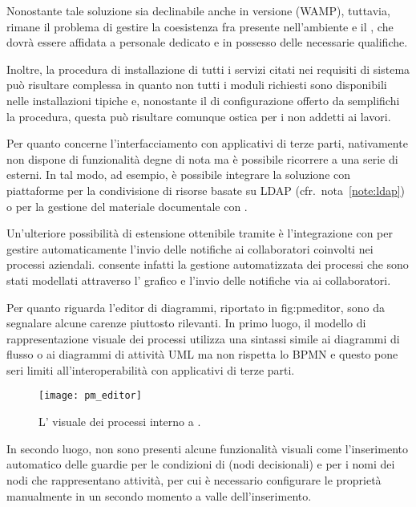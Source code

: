 Nonostante tale soluzione sia declinabile anche in versione  (WAMP), tuttavia, rimane il problema di gestire la coesistenza fra  presente nell'ambiente  e il  , che dovrà essere affidata a personale dedicato e in possesso delle necessarie qualifiche.

Inoltre, la procedura di installazione di tutti i servizi citati nei requisiti di sistema può risultare complessa in quanto non tutti i moduli richiesti sono disponibili nelle installazioni tipiche e, nonostante il  di configurazione offerto da \progname semplifichi la procedura, questa può risultare comunque ostica per i non addetti ai lavori.

Per quanto concerne l'interfacciamento con applicativi di terze parti, \progname nativamente non dispone di funzionalità degne di nota ma è possibile ricorrere a una serie di  esterni. In tal modo, ad esempio, è possibile integrare la soluzione con piattaforme per la condivisione di risorse basate su LDAP (cfr.~nota~\ref{note:ldap}) o per la gestione del materiale documentale con .

Un'ulteriore possibilità di estensione ottenibile tramite  è l'integrazione con  per gestire automaticamente l'invio delle notifiche ai collaboratori coinvolti nei processi aziendali. \progname consente infatti la gestione automatizzata dei processi che sono stati modellati attraverso l' grafico e l'invio delle notifiche	via  ai collaboratori.

Per quanto riguarda l'editor di diagrammi, riportato in \figurename{fig:pmeditor}, sono da segnalare alcune carenze piuttosto rilevanti. In primo luogo, il modello di rappresentazione visuale dei processi utilizza una sintassi simile ai diagrammi di flusso o ai diagrammi di attività UML ma non rispetta lo  BPMN e questo pone seri limiti all'interoperabilità con applicativi di terze parti.

\begin{figure}[H]
  \centering
  \texttt{[image: pm\_editor]}
  \caption{L' visuale dei processi interno a \progname.}
  \label{fig:pmeditor}
\end{figure}

In secondo luogo, non sono presenti alcune funzionalità visuali come l'inserimento automatico delle guardie per le condizioni di  (nodi decisionali) e per i nomi dei nodi che rappresentano attività, per cui è necessario configurare le proprietà manualmente in un secondo momento a valle dell'inserimento.

